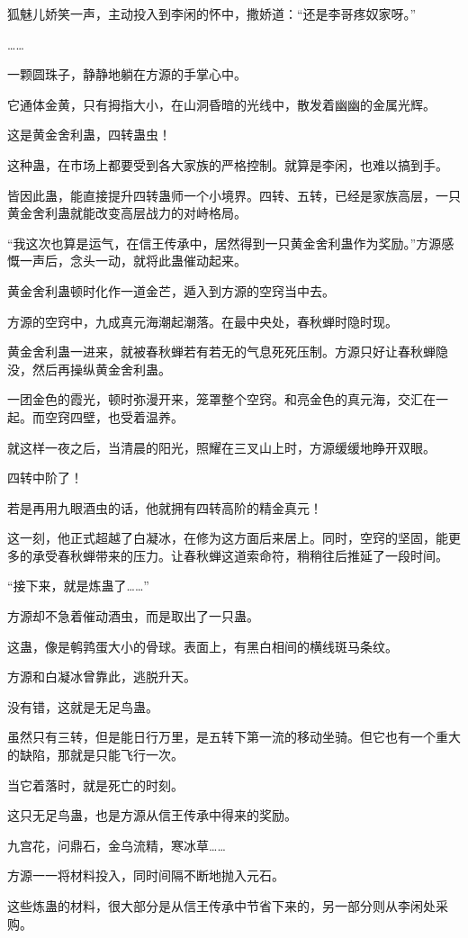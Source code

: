 \begin{this_body}
狐魅儿娇笑一声，主动投入到李闲的怀中，撒娇道：“还是李哥疼奴家呀。”

……

一颗圆珠子，静静地躺在方源的手掌心中。

它通体金黄，只有拇指大小，在山洞昏暗的光线中，散发着幽幽的金属光辉。

这是黄金舍利蛊，四转蛊虫！

这种蛊，在市场上都要受到各大家族的严格控制。就算是李闲，也难以搞到手。

皆因此蛊，能直接提升四转蛊师一个小境界。四转、五转，已经是家族高层，一只黄金舍利蛊就能改变高层战力的对峙格局。

“我这次也算是运气，在信王传承中，居然得到一只黄金舍利蛊作为奖励。”方源感慨一声后，念头一动，就将此蛊催动起来。

黄金舍利蛊顿时化作一道金芒，遁入到方源的空窍当中去。

方源的空窍中，九成真元海潮起潮落。在最中央处，春秋蝉时隐时现。

黄金舍利蛊一进来，就被春秋蝉若有若无的气息死死压制。方源只好让春秋蝉隐没，然后再操纵黄金舍利蛊。

一团金色的霞光，顿时弥漫开来，笼罩整个空窍。和亮金色的真元海，交汇在一起。而空窍四壁，也受着温养。

就这样一夜之后，当清晨的阳光，照耀在三叉山上时，方源缓缓地睁开双眼。

四转中阶了！

若是再用九眼酒虫的话，他就拥有四转高阶的精金真元！

这一刻，他正式超越了白凝冰，在修为这方面后来居上。同时，空窍的坚固，能更多的承受春秋蝉带来的压力。让春秋蝉这道索命符，稍稍往后推延了一段时间。

“接下来，就是炼蛊了……”

方源却不急着催动酒虫，而是取出了一只蛊。

这蛊，像是鹌鹑蛋大小的骨球。表面上，有黑白相间的横线斑马条纹。

方源和白凝冰曾靠此，逃脱升天。

没有错，这就是无足鸟蛊。

虽然只有三转，但是能日行万里，是五转下第一流的移动坐骑。但它也有一个重大的缺陷，那就是只能飞行一次。

当它着落时，就是死亡的时刻。

这只无足鸟蛊，也是方源从信王传承中得来的奖励。

九宫花，问鼎石，金乌流精，寒冰草……

方源一一将材料投入，同时间隔不断地抛入元石。

这些炼蛊的材料，很大部分是从信王传承中节省下来的，另一部分则从李闲处采购。


\end{this_body}
